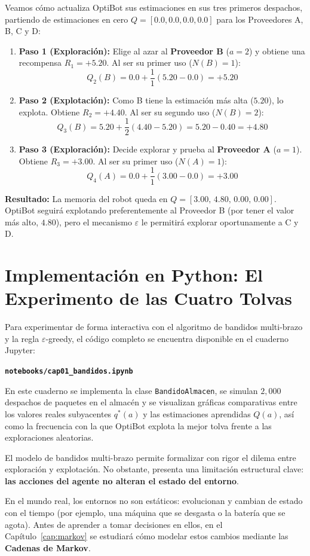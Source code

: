 \begin{calculomanual}
Veamos cómo actualiza OptiBot sus estimaciones en sus tres primeros despachos, partiendo de estimaciones en cero $Q = [0.0, 0.0, 0.0, 0.0]$ para los Proveedores A, B, C y D:
\begin{enumerate}
  \item \textbf{Paso 1 (Exploración):} Elige al azar al \textbf{Proveedor B} ($a=2$) y obtiene una recompensa $R_1 = +5.20$. Al ser su primer uso ($N(B)=1$):
  \[
    Q_2(B) = 0.0 + \frac{1}{1}(5.20 - 0.0) = \mathbf{+5.20}
  \]
  \item \textbf{Paso 2 (Explotación):} Como B tiene la estimación más alta ($5.20$), lo explota. Obtiene $R_2 = +4.40$. Al ser su segundo uso ($N(B)=2$):
  \[
    Q_3(B) = 5.20 + \frac{1}{2}(4.40 - 5.20) = 5.20 - 0.40 = \mathbf{+4.80}
  \]
  \item \textbf{Paso 3 (Exploración):} Decide explorar y prueba al \textbf{Proveedor A} ($a=1$). Obtiene $R_3 = +3.00$. Al ser su primer uso ($N(A)=1$):
  \[
    Q_4(A) = 0.0 + \frac{1}{1}(3.00 - 0.0) = \mathbf{+3.00}
  \]
\end{enumerate}
\noindent \textbf{Resultado:} La memoria del robot queda en $Q = [3.00, \, 4.80, \, 0.00, \, 0.00]$. OptiBot seguirá explotando preferentemente al Proveedor B (por tener el valor más alto, $4.80$), pero el mecanismo $\varepsilon$ le permitirá explorar oportunamente a C y D.
\end{calculomanual}

\section{Implementación en Python: El Experimento de las Cuatro Tolvas}
Para experimentar de forma interactiva con el algoritmo de bandidos multi-brazo y la regla $\varepsilon$-greedy, el código completo se encuentra disponible en el cuaderno Jupyter:
\begin{center}
  \textbf{\texttt{notebooks/cap01\_bandidos.ipynb}}
\end{center}
En este cuaderno se implementa la clase \texttt{BandidoAlmacen}, se simulan $2{,}000$ despachos de paquetes en el almacén y se visualizan gráficas comparativas entre los valores reales subyacentes $q^*(a)$ y las estimaciones aprendidas $Q(a)$, así como la frecuencia con la que OptiBot explota la mejor tolva frente a las exploraciones aleatorias.

\begin{notabox}
El modelo de bandidos multi-brazo permite formalizar con rigor el dilema entre exploración y explotación. No obstante, presenta una limitación estructural clave: \textbf{las acciones del agente no alteran el estado del entorno}. 

En el mundo real, los entornos no son estáticos: evolucionan y cambian de estado con el tiempo (por ejemplo, una máquina que se desgasta o la batería que se agota). Antes de aprender a tomar decisiones en ellos, en el Capítulo~\ref{cap:markov} se estudiará cómo modelar estos cambios mediante las \textbf{Cadenas de Markov}.
\end{notabox}
